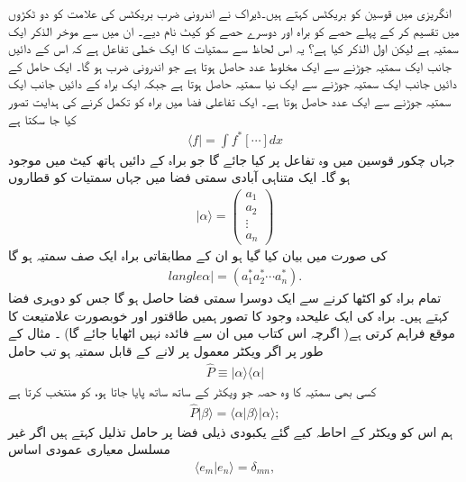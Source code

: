 

انگریزی میں قوسین کو بریکٹس کہتے ہیں۔ڈیراک نے اندرونی ضرب  بریکٹس کی علامت کو دو ٹکڑوں میں تقسیم کر کے پہلے حصے کو براہ  اور دوسرے حصے کو کیٹ  نام دیے۔ ان میں سے موخر الذکر ایک سمتیہ ہے لیکن اول الذکر کیا ہے؟ یہ اس لحاظ سے سمتیات کا ایک خطی تفاعل ہے کہ اس کے دائیں جانب ایک سمتیہ جوڑنے سے ایک مخلوط عدد حاصل ہوتا ہے جو اندرونی ضرب ہو گا۔ ایک حامل کے دائیں جانب ایک سمتیہ جوڑنے سے ایک نیا سمتیہ حاصل ہوتا ہے جبکہ ایک براہ کے دائیں جانب ایک سمتیہ جوڑنے سے ایک عدد حاصل ہوتا ہے۔ ایک تفاعلی فضا میں براہ کو تکمل کرنے کی ہدایت تصور کیا جا سکتا ہے 
\begin{align*}
\langle f | = \int f^{*} [ \cdots ] dx
\end{align*}
جہاں چکور قوسین میں وہ تفاعل پر کیا جائے گا جو براہ کے دائیں ہاتھ کیٹ میں موجود ہو گا۔ ایک متناہی آبادی سمتی فضا میں جہاں سمتیات کو قطاروں 
\begin{align}
| \alpha \rangle = \begin{pmatrix}
a_{1} \\ a_{2} \\ \vdots \\ a_{n} 
\end{pmatrix}
\end{align}
کی صورت میں بیان کیا گیا ہو ان کے مطابقاتی براہ ایک صف سمتیہ ہو گا
\begin{align}
langle \alpha | = ( a_{1}^{*}a_{2}^{*} \cdots a_{n}^{*}).
\end{align}
تمام براہ کو اکٹھا کرنے سے ایک دوسرا سمتی فضا حاصل ہو گا جس کو دوہری فضا کہتے ہیں۔
براہ کی ایک علیحدہ وجود کا تصور ہمیں طاقتور اور خوبصورت علامتیعت کا موقع فراہم کرتی ہے( اگرچہ اس کتاب میں ان سے فائدہ نہیں اٹھایا جائے گا) ۔ مثال کے طور پر اگر ویکٹر  معمول پر لانے کے قابل سمتیہ ہو تب حامل 
\begin{align}
\hat{P} \equiv | \alpha \rangle \langle \alpha | 
\end{align}
کسی بھی سمتیہ کا وہ حصہ جو ویکٹر  کے ساتھ ساتھ پایا جاتا ہو، کو منتخب کرتا ہے 
\begin{align*}
\hat{P} | \beta \rangle = \langle \alpha | \beta \rangle | \alpha \rangle ;
\end{align*}
ہم اس کو ویکٹر  کے احاطہ کیے گئے یکبودی ذیلی فضا پر حامل تذلیل کہتے ہیں اگر  غیر مسلسل معیاری عمودی اساس
\begin{align}
\langle e_{m} | e_{n} \rangle = \delta_{mn},
\end{align}
